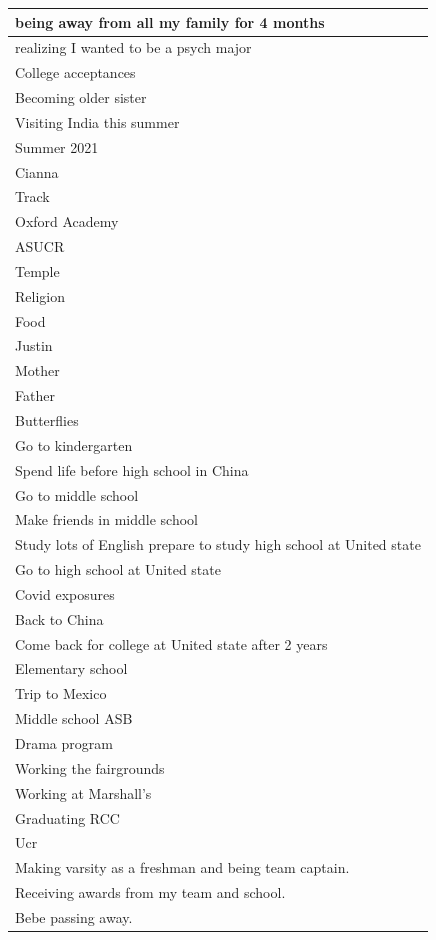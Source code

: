 \documentclass[
  .7em,
  letterpaper,
  DIV=11,
  numbers=noendperiod]{scrartcl}
\begin{document}
\begin{table}
\begin{tabular}{l}
\hline
being away from all my family for 4 months\\
\hline
realizing I wanted to be a psych major\\
\hline
College acceptances\\
\hline
Becoming older sister\\
\hline
Visiting India this summer\\
\hline
Summer 2021\\
\hline
Cianna\\
\hline
Track\\
\hline
Oxford Academy\\
\hline
ASUCR\\
\hline
Temple\\
\hline
Religion\\
\hline
Food\\
\hline
Justin\\
\hline
Mother\\
\hline
Father\\
\hline
Butterflies\\
\hline
Go to kindergarten\\
\hline
Spend life before high school in China\\
\hline
Go to middle school\\
\hline
Make friends in middle school\\
\hline
Study lots of English prepare to study high school at United state\\
\hline
Go to high school at United state\\
\hline
Covid exposures\\
\hline
Back to China\\
\hline
Come back for college at United state after 2 years\\
\hline
Elementary school\\
\hline
Trip to Mexico\\
\hline
Middle school ASB\\
\hline
Drama program\\
\hline
Working the fairgrounds\\
\hline
Working at Marshall’s\\
\hline
Graduating RCC\\
\hline
Ucr\\
\hline
Making varsity as a freshman and being team captain.\\
\hline
Receiving awards from my team and school.\\
\hline
Bebe passing away.\\
\hline

\end{tabular}
\end{table}
\end{document}
